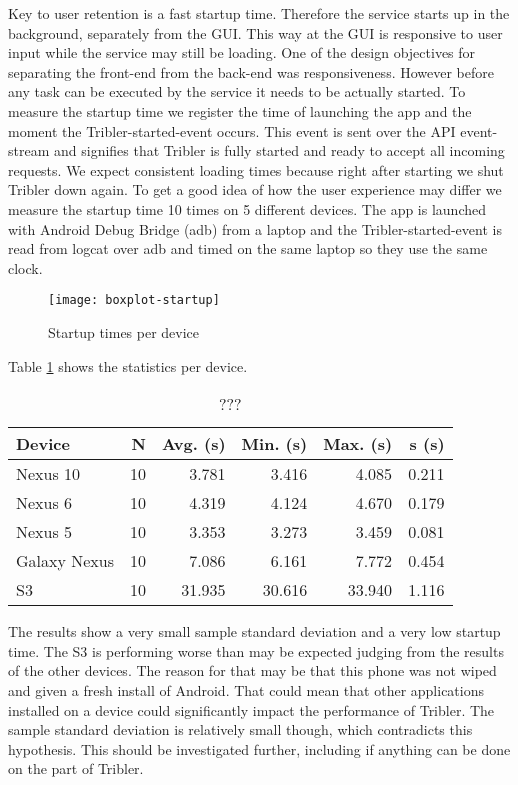 Key to user retention is a fast startup time.
Therefore the service starts up in the background, separately from the GUI.
This way at the GUI is responsive to user input while the service may still be loading.
One of the design objectives for separating the front-end from the back-end was responsiveness.
However before any task can be executed by the service it needs to be actually started.
To measure the startup time we register the time of launching the app and the moment the Tribler-started-event occurs.
This event is sent over the API event-stream and signifies that Tribler is fully started and ready to accept all incoming requests.
We expect consistent loading times because right after starting we shut Tribler down again.
To get a good idea of how the user experience may differ we measure the startup time 10 times on 5 different devices.
The app is launched with Android Debug Bridge (adb) from a laptop and the Tribler-started-event is read from logcat over adb and timed on the same laptop so they use the same clock.
\begin{figure}[H]
	\centering %
	\texttt{[image: boxplot-startup]}
	\caption{Startup times per device}
	\label{fig:boxplot-startup}
\end{figure}
Table \ref{table:startup_time} shows the statistics per device.
\begin{table}
	\begin{tabular}{l | *{5}{r}} \hline
		Device & N & Avg. (s) & Min. (s) & Max. (s) & s (s) \\ \hline \hline
		Nexus 10        & 10 & 3.781 & 3.416 & 4.085 & 0.211 \\ \hline
		Nexus 6          & 10 & 4.319 & 4.124 & 4.670 & 0.179 \\ \hline
		Nexus 5          & 10 & 3.353 & 3.273 & 3.459 & 0.081 \\ \hline
		Galaxy Nexus & 10 & 7.086 & 6.161 & 7.772 & 0.454 \\ \hline
		S3                   & 10 & 31.935 & 30.616 & 33.940 & 1.116 \\ \hline
	\end{tabular}
	\caption{???}
	\label{table:startup_time}
\end{table}
The results show a very small sample standard deviation and a very low startup time.
The S3 is performing worse than may be expected judging from the results of the other devices.
The reason for that may be that this phone was not wiped and given a fresh install of Android.
That could mean that other applications installed on a device could significantly impact the performance of Tribler.
The sample standard deviation is relatively small though, which contradicts this hypothesis.
This should be investigated further, including if anything can be done on the part of Tribler.


